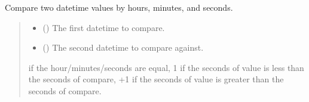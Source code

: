 \documentclass[letterpaper,10pt,english]{sphinxmanual}
\begin{document}
\begin{fulllineitems}
\begin{fulllineitems}
\begin{quote}
\begin{description}
\end{description}\end{quote}

\end{fulllineitems}


\begin{fulllineitems}
\label{\detokenize{apache_commons_validator_python.routines:apache_commons_validator_python.routines.time_validator.TimeValidator.compare_seconds}}
\pysigstartsignatures
{}
\pysigstopsignatures
\sphinxAtStartPar
Compare two datetime values by hours, minutes, and seconds.
\begin{quote}\begin{description}
\begin{itemize}
\item {} 
\sphinxAtStartPar
{} () \textendash{} The first datetime to compare.

\item {} 
\sphinxAtStartPar
{} () \textendash{} The second datetime to compare against.

\end{itemize}

 if the hour/minutes/seconds are equal,
\sphinxhyphen{}1 if the seconds of value is less than the seconds of compare,
+1 if the seconds of value is greater than the seconds of compare.

\end{description}\end{quote}

\end{fulllineitems}



\end{fulllineitems}
\end{document}
